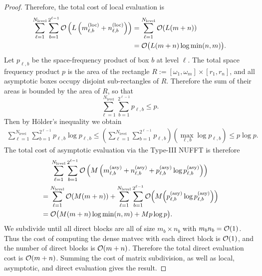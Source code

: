 \begin{proof}
    Therefore, the total cost of local evaluation is 
    \begin{equation}
      \begin{aligned}
        \sum_{\ell=1}^{N_{\text{level}}} \sum_{b=1}^{2^{\ell-1}} \mathcal{O}\left(L\left(m_{\ell,b}^{(\text{loc})} + n_{\ell,b}^{(\text{loc})}\right)\right)
        &= \sum_{\ell=1}^{N_{\text{level}}} \mathcal{O}(L(m + n)) \\
        &= \mathcal{O}\big(L (m + n) \log \min(n,m)\big).
      \end{aligned}
    \end{equation}
    Let $p_{\ell,b}$ be the space-frequency product of box $b$ at level $\ell$.
    The total space frequency product $p$ is the area of the rectangle $R :=
    [\omega_1, \omega_m] \times [r_1, r_n]$, and all asymptotic boxes occupy
    disjoint sub-rectangles of $R$. Therefore the sum of their areas is bounded
    by the area of $R$, so that $$\sum_{\ell=1}^{N_{\text{level}}}
    \sum_{b=1}^{2^{\ell-1}} p_{\ell,b} \leq p.$$ Then by H\"older's inequality
    we obtain 
    \begin{align} 
        \sum_{\ell=1}^{N_{\text{level}}} \sum_{b=1}^{2^{\ell-1}} p_{\ell,b} \log p_{\ell,b}
        \leq \left( \sum_{\ell=1}^{N_{\text{level}}} \sum_{b=1}^{2^{\ell-1}} p_{\ell,b} \right) \left(\max_{\ell,b} \log p_{\ell,b} \right) 
        \leq p \log p.
    \end{align}
    The total cost of asymptotic evaluation via the Type-III NUFFT is therefore
    \begin{multline}
      \sum_{\ell=1}^{N_{\text{level}}} \sum_{b=1}^{2^{\ell-1}}
        \mathcal{O}\left(M\left(m_{\ell,b}^{(\text{asy})} + n_{\ell,b}^{(\text{asy})} +
            p_{\ell,b}^{(\text{asy})} \log p_{\ell,b}^{(\text{asy})}
          \right)\right) \\
        \begin{aligned}
        &= \sum_{\ell=1}^{N_{\text{level}}} \mathcal{O}(M(m + n)) +
        \sum_{\ell=1}^{N_{\text{level}}} \sum_{b=1}^{2^{\ell-1}}
        \mathcal{O}\Big(M\Big(p_{\ell,b}^{(\text{asy})} \log
          p_{\ell,b}^{(\text{asy})}\Big)\Big)\\
        &= \mathcal{O}\big(M (m + n) \log \min(n,m) + Mp\log p\big).
        \end{aligned}
      \end{multline}
    We subdivide until all direct blocks are all of size $m_b \times n_b$ with
    $m_bn_b = \mathcal{O}(1)$. Thus the cost of computing the dense matvec with each
    direct block is $\mathcal{O}(1)$, and the number of direct blocks is $\mathcal{O}(m + n)$.
    Therefore the total direct evaluation cost is $\mathcal{O}(m + n)$. Summing the cost
    of matrix subdivision, as well as local, asymptotic, and direct evaluation
    gives the result.
\end{proof}

